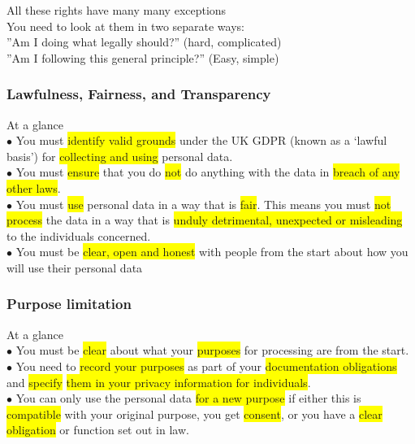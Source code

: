 \documentclass[tikz,border=10pt]{project_plan}
\newcommand{\bulletPoint}{\hspace{-3.1pt}$\bullet$ \hspace{5pt}}
\begin{document}
All these rights have many many exceptions \\
You need to look at them in two separate ways: \\
”Am I doing what legally should?”  (hard, complicated)\\
”Am I following this general principle?” (Easy, simple)

\subsubsection{Lawfulness, Fairness, and Transparency}

At a glance\\
\bulletPoint You must \colorbox{yellow}{identify valid grounds} under the UK GDPR (known as a ‘lawful basis’) for \colorbox{yellow}{collecting and using} personal data.\\
\bulletPoint You must \colorbox{yellow}{ensure} that you do \colorbox{yellow}{not} do anything with the data in \colorbox{yellow}{breach of any other laws}.\\
\bulletPoint You must \colorbox{yellow}{use} personal data in a way that is \colorbox{yellow}{fair}. This means you must \colorbox{yellow}{not process} the data in a way that is \colorbox{yellow}{unduly detrimental, unexpected or misleading} to the individuals concerned.\\
\bulletPoint You must be \colorbox{yellow}{clear, open and honest} with people from the start about how you will use their personal data

\subsubsection{Purpose limitation}

At a glance\\
\bulletPoint You must be \colorbox{yellow}{clear} about what your \colorbox{yellow}{purposes} for processing are from the start.\\
\bulletPoint You need to \colorbox{yellow}{record your purposes} as part of your \colorbox{yellow}{documentation obligations} and \colorbox{yellow}{specify}  \colorbox{yellow}{them in your privacy information for individuals}.\\
\bulletPoint You can only use the personal data \colorbox{yellow}{for a new purpose} if either this is \colorbox{yellow}{compatible} with your original purpose, you get \colorbox{yellow}{consent}, or you have a \colorbox{yellow}{clear obligation} or function set out in law.
\end{document}
